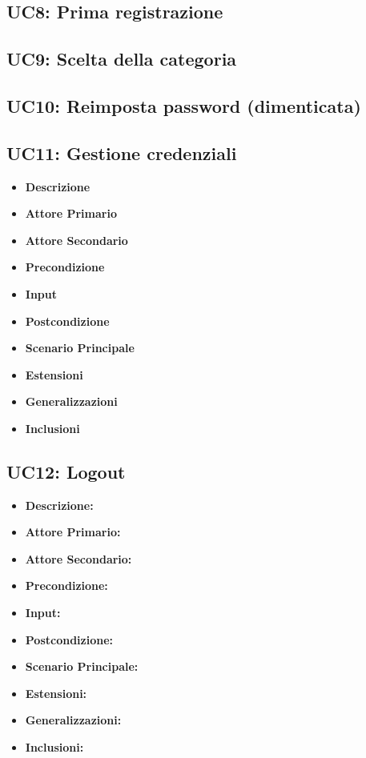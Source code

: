         \subsection{UC8: Prima registrazione}
        \subsection{UC9: Scelta della categoria}
        \subsection{UC10: Reimposta password (dimenticata)}
        \subsection{UC11: Gestione credenziali}
        \begin{itemize}
            \item \textbf{Descrizione}
            \item \textbf{Attore Primario}
            \item \textbf{Attore Secondario}
            \item \textbf{Precondizione}
            \item \textbf{Input}
            \item \textbf{Postcondizione}
            \item \textbf{Scenario Principale}
            \item \textbf{Estensioni}
            \item \textbf{Generalizzazioni}
            \item \textbf{Inclusioni}
        \end{itemize}

        
        \subsection{UC12: Logout}
        \begin{itemize}
            \item \textbf{Descrizione:}
            \item \textbf{Attore Primario:}
            \item \textbf{Attore Secondario:}
            \item \textbf{Precondizione:}
            \item \textbf{Input:}
            \item \textbf{Postcondizione:}
            \item \textbf{Scenario Principale:}
            \item \textbf{Estensioni:}
            \item \textbf{Generalizzazioni:}
            \item \textbf{Inclusioni:}
        \end{itemize}


